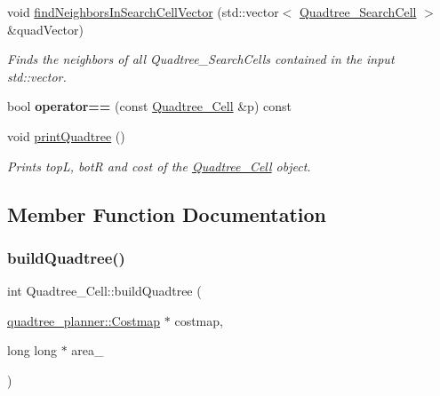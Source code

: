 \begin{DoxyCompactItemize}
void \hyperlink{classQuadtree__Cell_aa3bad1fe80dbfc5b576e63635481e11d}{find\+Neighbors\+In\+Search\+Cell\+Vector} (std\+::vector$<$ \hyperlink{classQuadtree__SearchCell}{Quadtree\+\_\+\+Search\+Cell} $>$ \&quad\+Vector)
\begin{DoxyCompactList}\small\item\em Finds the neighbors of all Quadtree\+\_\+\+Search\+Cells contained in the input std\+::vector. \end{DoxyCompactList}\item 
\mbox{\label{classQuadtree__Cell_a070aaa76b5c28fc1473d5943019e9fb8}} 
bool {\bfseries operator==} (const \hyperlink{classQuadtree__Cell}{Quadtree\+\_\+\+Cell} \&p) const
\item 
\mbox{\label{classQuadtree__Cell_aedc198bc943d4d7214abd3b2477d95f5}} 
void \hyperlink{classQuadtree__Cell_aedc198bc943d4d7214abd3b2477d95f5}{print\+Quadtree} ()
\begin{DoxyCompactList}\small\item\em Prints topL, botR and cost of the \hyperlink{classQuadtree__Cell}{Quadtree\+\_\+\+Cell} object. \end{DoxyCompactList}\end{DoxyCompactItemize}


\subsection{Member Function Documentation}
\mbox{\label{classQuadtree__Cell_af2b30e86c7180372b97177d43888210c}} 
\subsubsection{\texorpdfstring{build\+Quadtree()}{buildQuadtree()}}
{\footnotesize\ttfamily int Quadtree\+\_\+\+Cell\+::build\+Quadtree (\begin{DoxyParamCaption}\item[{\hyperlink{classquadtree__planner_1_1Costmap}{quadtree\+\_\+planner\+::\+Costmap} $\ast$}]{costmap,  }\item[{long long $\ast$}]{area\+\_\+ }\end{DoxyParamCaption})}



